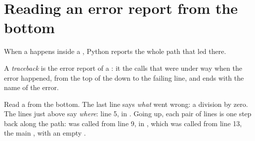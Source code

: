 \section{Reading an error report from the bottom}

When a  happens inside a , Python reports the whole path
that led there.

\begin{definition}[Traceback]\label{def:g7:finding-and-fixing-bugs:traceback}
A \emph{traceback} is the error report of a : it
 the calls that were under way when the error happened, from the top of
the  down to the failing line, and ends with the name of the error.
\end{definition}

\label{lst:g7:finding-and-fixing-bugs:two-calls}

\label{out:g7:finding-and-fixing-bugs:two-calls}

Read a  from the bottom. The last line says \emph{what} went wrong: a
division by zero. The lines just above say \emph{where}: line 5, in
. Going up, each pair of lines is one step back along the path:
 was called from line 9, in , which was called from
line 13, the main , with an empty .

